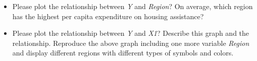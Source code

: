 \documentclass[12pt,letterpaper]{article}
\begin{document}
\begin{itemize}
\vspace{.5cm}
\item
Please plot the relationship between \emph{Y} and \emph{Region}? On average, which region has the highest per capita expenditure on housing assistance?
\vspace{.5cm}
\item
Please plot the relationship between \emph{Y} and \emph{X1}? Describe this graph and the relationship. Reproduce the above graph including one more variable \emph{Region} and display different regions with different types of symbols and colors.
\end{itemize}
\end{document}
